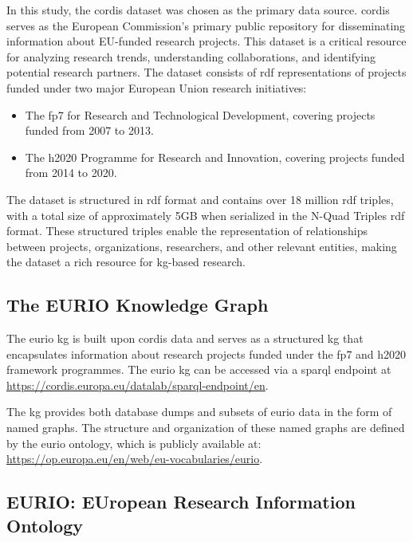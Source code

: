In this study, the \gls{cordis} dataset \cite{CORDIS_FP7_2015,CORDIS_H2020_2015,CORDIS_RefData_2018} was chosen as the primary data source.
\gls{cordis} serves as the European Commission's primary public repository for disseminating information about EU-funded research projects.
This dataset is a critical resource for analyzing research trends, understanding collaborations, and identifying potential research partners.
The dataset consists of \gls{rdf} representations of projects funded under two major European Union research initiatives:
\begin{itemize}
    \item The \gls{fp7} for Research and Technological Development, covering projects funded from 2007 to 2013.
    \item The \gls{h2020} Programme for Research and Innovation, covering projects funded from 2014 to 2020.
\end{itemize}

The dataset is structured in \gls{rdf} format and contains over 18 million \gls{rdf} triples, with a total size of approximately 5GB when serialized in the N-Quad Triples \gls{rdf} format.
These structured triples enable the representation of relationships between projects, organizations, researchers, and other relevant entities, making the dataset a rich resource for \gls{kg}-based research.

\subsection*{The EURIO Knowledge Graph}

The \gls{eurio} \acrlong{kg} \cite{CORDIS_EURIO_2022} is built upon \gls{cordis} data and serves as a structured \gls{kg} that encapsulates information about research projects funded under the \gls{fp7} and \gls{h2020} framework programmes.
The \gls{eurio} \gls{kg} can be accessed via a \gls{sparql} endpoint at \url{https://cordis.europa.eu/datalab/sparql-endpoint/en}.

The \gls{kg} provides both database dumps and subsets of \gls{eurio} data in the form of named graphs.
The structure and organization of these named graphs are defined by the \gls{eurio} ontology, which is publicly available at: \url{https://op.europa.eu/en/web/eu-vocabularies/eurio}.

\subsection*{EURIO: EUropean Research Information Ontology}

